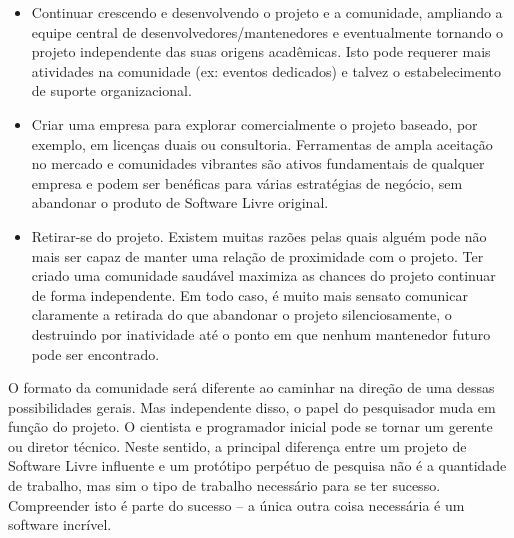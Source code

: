%
\begin{itemize}
\item Continuar crescendo e desenvolvendo o projeto e a comunidade,
ampliando a equipe central de desenvolvedores/mantenedores e eventualmente tornando
o projeto independente das suas origens acadêmicas. Isto pode requerer mais
atividades na comunidade (ex: eventos dedicados) e talvez o estabelecimento de
suporte organizacional.
%
\item Criar uma empresa para explorar comercialmente o projeto baseado, por exemplo,
em licenças duais ou consultoria. Ferramentas de ampla aceitação no mercado e
comunidades vibrantes são ativos fundamentais de qualquer empresa e podem ser
benéficas para várias estratégias de negócio, sem abandonar o produto de Software
Livre original.
%
\item Retirar-se do projeto. Existem muitas razões pelas quais alguém pode não
mais ser capaz de manter uma relação de proximidade com o projeto. Ter criado
uma comunidade saudável maximiza as chances do projeto continuar de forma independente.
Em todo caso, é muito mais sensato comunicar claramente a retirada do que abandonar
o projeto silenciosamente, o destruindo por inatividade até o ponto em que nenhum
mantenedor futuro pode ser encontrado.
\end{itemize}
%
O formato da comunidade será diferente ao caminhar na direção de uma dessas possibilidades
gerais. Mas independente disso, o papel do pesquisador muda em função do projeto. O cientista
e programador inicial pode se tornar um gerente ou diretor técnico. Neste sentido, a principal
diferença entre um projeto de Software Livre influente e um protótipo perpétuo de pesquisa
não é a quantidade de trabalho, mas sim o tipo de trabalho necessário para se ter sucesso.
Compreender isto é parte do sucesso -- a única outra coisa necessária é um software incrível.
